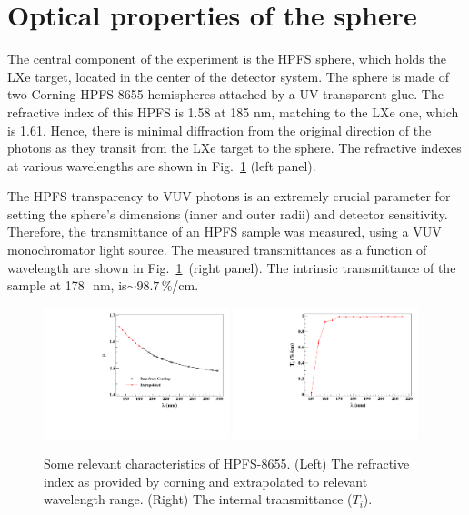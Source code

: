 \section{Optical properties of the sphere }
\label{sec:opt}

The central component of the experiment is the HPFS sphere, which holds the LXe target, located in the center of the detector system. The sphere is made of two Corning HPFS 8655 hemispheres attached by a UV transparent glue. The refractive index of this HPFS is 1.58 at 185 nm, matching to the LXe one, which is 1.61. Hence, there is minimal diffraction from the original direction of the photons as they transit from the LXe target to the sphere. The refractive indexes at various wavelengths are shown in Fig.~\ref{fig:hpfsRIcalibration} (left panel).


The HPFS transparency to VUV photons is an extremely crucial parameter for setting the sphere's dimensions (inner and outer radii) and detector sensitivity. Therefore, the transmittance of an HPFS sample was measured, using a VUV monochromator light source. 
The measured transmittances as a function of wavelength are shown in Fig.~\ref{fig:hpfsRIcalibration}~(right panel). The \sout{intrinsic} transmittance of the sample at 178~\,nm, is$\sim98.7$\,\%/cm.  

\begin{figure}[h]
   \centering
   \includegraphics[width=0.48\textwidth]{RI-calibration.pdf}
    \includegraphics[width=0.48\textwidth]{IntTransmittance.pdf}
   \caption{Some relevant characteristics of HPFS-8655. (Left) The refractive index as provided by corning and 
   extrapolated to relevant wavelength range. (Right) The internal transmittance ($T_{i}$).} 
   \label{fig:hpfsRIcalibration}
\end{figure}


